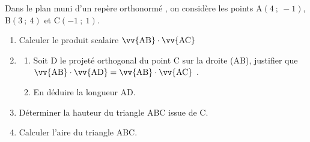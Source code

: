 \medskip

Dans le plan muni d’un repère orthonormé \Oij, on considère les points A$(4~;~-1)$,
B$(3~;~4)$ et \mbox{C$(-1~;~1)$}.

\begin{enumerate}
\item Calculer le produit scalaire $\vv{\text{AB}}\cdot \vv{\text{AC}}$
\item \begin{enumerate}
\item Soit D le projeté orthogonal du point C sur la droite (AB), justifier que
$\vv{\text{AB}}\cdot\vv{\text{AD}} = \vv{\text{AB}}\cdot \vv{\text{AC}}$ .
\item En déduire la longueur AD.
\end{enumerate}
\item Déterminer la hauteur du triangle ABC issue de C.
\item Calculer l’aire du triangle ABC.
\end{enumerate}

\vspace{0,5cm}
